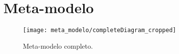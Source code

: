 
%

\begin{comment}

\chapter{Tipos de Dashboards}
\label{app:tipos_dashboards_app}

\begin{figure}[htbp]
  \begin{subfigure}{0.5\textwidth}
    \texttt{[image: strategic-dashboard.png]} 
    \caption{Exemplo de um \textit{dashboard} estratégico \cite{IntrafocusKPIDashboard}.}
    \label{fig:strat-dash}
  \end{subfigure}
  \begin{subfigure}{0.5\textwidth}
    \texttt{[image: operational-dashboard.jpg]}
    \caption{Exemplo de um \textit{dashboard} operacional \cite{RegendusPowerBIAlternatives}.}
    \label{fig:op-dash}
  \end{subfigure}
  \begin{subfigure}{0.5\textwidth}
    \texttt{[image: analytical-dashboard3-remake.png]}
    \caption{Exemplo de um \textit{dashboard} analítico \cite{QlikAnalyticsDashboard}.}
    \label{fig:anal-dash}
  \end{subfigure}
  
  \caption{Diferentes tipos de \textit{Dashboards}}
  \label{fig:image2}
\end{figure}

\end{comment}

\chapter{Meta-modelo}
\label{app:meta_modelo_app}

\begin{figure}[htbp]
  \texttt{[image: meta\_modelo/completeDiagram\_cropped]}
  \centering
  \caption{Meta-modelo completo.}
  \label{fig:meta_modelo_img}
\end{figure}


